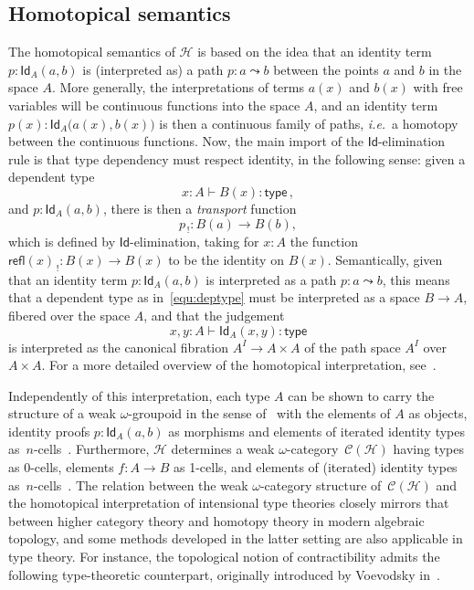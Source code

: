\documentclass{article}
\newcommand{\type}{\mathsf{type}}
\newcommand{\Id}{\mathsf{Id}}
\newcommand{\id}[1]{\Id_{#1}}
\newcommand{\refl}{\mathsf{refl}}
\newcommand{\Hint}{\mathcal{H}}
\theoremstyle{remark}
\theoremstyle{definition}
\begin{document}
\subsection{Homotopical semantics} 

\noindent The homotopical semantics of  $\Hint$ is based on the idea that an identity term~$p:  \id{A}(a,b)$ 
is (interpreted as) a path $p: a\leadsto b$ between the points $a$ and $b$ in the space $A$.   
More generally, the interpretations of terms $a(x)$ and $b(x)$ with free variables will be continuous 
functions into the 
space $A$, and an identity term $p(x) :  \id{A}\big(a(x),b(x)\big)$ is then a 
continuous family of paths, \emph{i.e.}~a homotopy between the continuous functions. Now, the main import of the 
$\Id$-elimination rule is that  type dependency must respect identity, in the following sense: given a dependent type
\begin{equation}
\label{equ:deptype}
x:A \vdash B(x) : \type \, ,
\end{equation} 
and $p: \id{A}(a,b)$, there is then a \emph{transport} function 
 $$p_{\, ! } : B(a) \rightarrow B(b),$$ which is defined by $\Id$-elimination, taking for $x : A$
the function $\refl(x)_{\, !} : B(x) \rightarrow B(x)$ to be the identity on $B(x)$.  Semantically, 
given that an identity term $p: \id{A}(a,b)$ is interpreted as a path $p: a\leadsto b$, 
 this means that a dependent type as in~\eqref{equ:deptype} must be interpreted as a space $B\rightarrow A$, fibered
 over the space $A$,  and that the judgement
  \[
  x,y:A \vdash\id{A}(x,y) : \type
  \] 
  is interpreted as the canonical fibration $A^I \rightarrow A\times A$ 
 of the path space $A^I$ over $A \times A$. For a more detailed overview of the homotopical interpretation, 
 see~\cite{AwodeyS:typth}.

Independently of this interpretation, each type $A$ can be shown to carry the structure of a weak 
$\omega$-groupoid in the sense of~\cite{BataninM:mongcn,LeinsterT:higohc} with the elements of $A$ as objects, identity proofs $p : \id{A}(a,b)$ as morphisms and 
 elements of iterated identity types 
 as~$n$-cells~\cite{vandenBergB:typwg,LumsdaineP:weaci}. Furthermore, $\Hint$ 
 determines a weak $\omega$-category~$\mathcal{C}(\Hint)$ having types as 0-cells, elements $f : A \rightarrow B$ as 1-cells, and elements of (iterated) identity types 
as~$n$-cells~\cite{Lumsdaine:higcft}.   The relation between the weak $\omega$-category structure of~$\mathcal{C}(\Hint)$ and the homotopical interpretation of intensional type theories closely mirrors that between higher category theory and homotopy theory in modern algebraic topology, and some methods developed in the latter setting are also applicable in type theory.  For instance,
 the topological notion of contractibility admits the following type-theoretic counterpart, originally
 introduced by Voevodsky in~\cite{VoevodskyV:unifc}.
\end{document}

